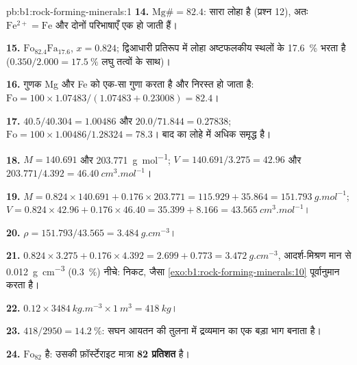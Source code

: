 \begin{solution}{pb:b1:rock-forming-minerals:1}
\textbf{14.} $\mathrm{Mg\#} = 82.4$: सारा लोहा  है (प्रश्न 12), अतः $\mathrm{Fe^{2+}} = \mathrm{Fe}$ और दोनों
परिभाषाएँ एक हो जाती हैं।

\textbf{15.} $\text{Fo}_{82.4}\text{Fa}_{17.6}$, $x = 0.824$; द्विआधारी प्रतिरूप में लोहा अष्टफलकीय स्थलों के
\qty{17.6}{\percent} भरता है ($0.350/2.000 = \qty{17.5}{\percent}$ लघु तत्वों के साथ)।

\textbf{16.} गुणक Mg और Fe को एक-सा गुणा करता है और निरस्त हो जाता है:
$\mathrm{Fo} = 100\times1.07483/(1.07483 + 0.23008) = 82.4$।

\textbf{17.} $40.5/40.304 = 1.00486$ और $20.0/71.844 = 0.27838$;
$\mathrm{Fo} = 100\times1.00486/1.28324 = 78.3$। बाद का  लोहे में अधिक समृद्ध है।

\textbf{18.} $M = 140.691$ और \qty{203.771}{g.mol^{-1}};
$V = 140.691/3.275 = 42.96$ और $203.771/4.392 =
\qty{46.40}{cm^3.mol^{-1}}$।

\textbf{19.} $M = 0.824\times140.691 + 0.176\times203.771 = 115.929 +
35.864 = \qty{151.793}{g.mol^{-1}}$; $V = 0.824\times42.96 +
0.176\times46.40 = 35.399 + 8.166 = \qty{43.565}{cm^3.mol^{-1}}$।

\textbf{20.} $\rho = 151.793/43.565 = \qty{3.484}{g.cm^{-3}}$।

\textbf{21.} $0.824\times3.275 + 0.176\times4.392 = 2.699 + 0.773 =
\qty{3.472}{g.cm^{-3}}$, आदर्श-मिश्रण मान से \qty{0.012}{g.cm^{-3}} (\qty{0.3}{\percent}) नीचे: निकट, जैसा
\cref{exo:b1:rock-forming-minerals:10} पूर्वानुमान करता है।

\textbf{22.} $0.12\times\qty{3484}{kg.m^{-3}}\times\qty{1}{m^3} =
\qty{418}{kg}$।

\textbf{23.} $418/2950 = \qty{14.2}{\percent}$: सघन  आयतन की तुलना में द्रव्यमान का एक बड़ा भाग बनाता है।

\textbf{24.}  $\text{Fo}_{82}$ है: उसकी फ़ॉर्स्टेराइट मात्रा \textbf{82 प्रतिशत} है।
\end{solution}
